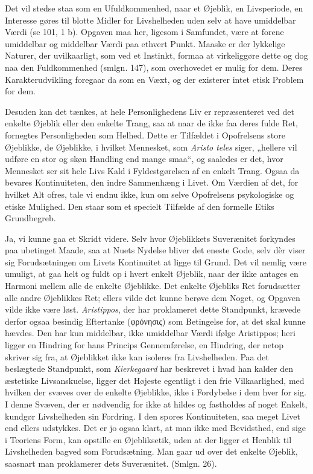 \documentclass[12pt,a4paper]{book}
\newcommand{\opage}[1]{\marginnote{\footnotesize\textit{[#1]}}}
\begin{document}
Det vil stedse staa som en Ufuldkommenhed, naar et Øjeblik, en Livsperiode, en Interesse
gøres til blotte Midler for Livshelheden uden selv at have umiddelbar Værdi (se 101, 1 b).
Opgaven maa her, ligesom i Samfundet, være at forene umiddelbar og middelbar Værdi paa
ethvert Punkt. Maaske er der lykkelige Naturer, der uvilkaarligt, som ved et Instinkt,
formaa at virkeliggøre dette og dog naa den Fuldkommenhed (smlgn. 147), som overhovedet er
mulig for dem. Deres Karakterudvikling foregaar da som en Væxt, og der existerer intet
etisk Problem for dem.

Desuden kan det tænkes, at hele Personlighedens Liv er repræsenteret ved det enkelte
Øjeblik eller den enkelte Trang, saa at naar de ikke faa deres fulde Ret, fornegtes
Personligheden som Helhed. Dette er Tilfældet i Opofrelsens store Øjeblikke, de Øjeblikke, i
hvilket Mennesket, som \emph{Aristo%
\opage{358}teles} siger, „hellere vil udføre en stor og skøn
Handling end mange smaa“, og saaledes er det, hvor Mennesket ser sit hele Livs Kald i
Fyldestgørelsen af en enkelt Trang. Ogsaa da bevares Kontinuiteten, den indre Sammenhæng i
Livet. Om Værdien af det, for hvilket Alt ofres, tale vi endnu ikke, kun om selve
Opofrelsens psykologiske og etiske Mulighed. Den staar som et specielt Tilfælde af den
formelle Etiks Grundbegreb.

Ja, vi kunne gaa et Skridt videre. Selv hvor Øjeblikkets Suverænitet forkyndes paa ubetinget
Maade, saa at Nuets Nydelse bliver det eneste Gode, selv dèr viser sig Forudsætningen om
Livets Kontinuitet at ligge til Grund. Det vil nemlig være umuligt, at gaa helt og fuldt op i hvert enkelt Øjeblik, naar der ikke antages en Harmoni mellem alle de enkelte Øjeblikke.
Det enkelte Øjebliks Ret forudsætter alle andre Øjeblikkes Ret; ellers vilde det kunne
berøve dem Noget, og Opgaven vilde ikke være løst. \emph{Aristippos}, der har proklameret
dette Standpunkt, krævede derfor ogsaa besindig Eftertanke (φρόνησις) som Betingelse for, at
det skal kunne hævdes. Den har kun middelbar, ikke umiddelbar Værdi ifølge Aristippos; heri ligger en Hindring for hans Princips Gennemførelse, en Hindring, der netop skriver sig
fra, at Øjeblikket ikke kan isoleres fra Livshelheden. Paa det beslægtede Standpunkt, som \emph{Kierkegaard} har beskrevet i hvad han kalder den
æstetiske Livsanskuelse, ligger det Højeste egentligt i den frie Vilkaarlighed, med hvilken
der svæves over de enkelte Øjeblikke, ikke i Fordybelse i dem hver for sig. I denne Svæven,
der er nødvendig for ikke at hildes og fastholdes af noget Enkelt, kundgør Livshelheden sin
Fordring. I den spores Kontinuiteten, saa meget Livet end ellers udstykkes. Det er jo ogsaa
klart, at man ikke med Bevidsthed, end sige i Teoriens Form, kan opstille en Øjebliksetik,
uden at der ligger et Henblik til Livshelheden bagved som Forudsætning. Man gaar ud over det
enkelte Øjeblik, saasnart man proklamerer dets Suverænitet. (Smlgn. 26).
\end{document}
